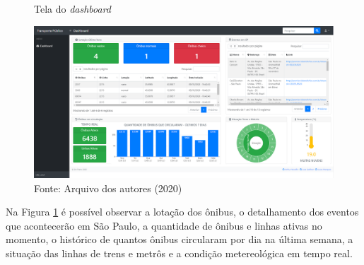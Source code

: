 \begin{figure}[H]
    \centering
    \caption{Tela do \textit{dashboard}}
    \includegraphics[width=1.0\linewidth]{Imagens/dashboard1.png}
    \caption*{Fonte: Arquivo dos autores (2020)}
    \label{telaDashboard1}
\end{figure}
\indent
\par Na Figura \ref{telaDashboard1} é possível observar a lotação dos ônibus, o detalhamento dos eventos que acontecerão em São Paulo, a quantidade de ônibus e linhas ativas no momento, o histórico de quantos ônibus circularam por dia na última semana, a situação das linhas de trens e metrôs e a condição metereológica em tempo real.










